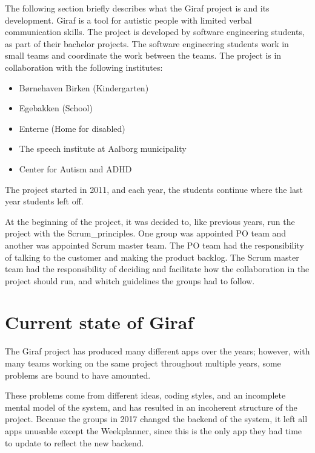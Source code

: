 The following section briefly describes what the Giraf project is and its development. 
Giraf is a tool for autistic people with limited verbal communication skills. The project is developed by software engineering students, as part of their bachelor projects. The software engineering students work in small teams and coordinate the work between the teams. The project is in collaboration with the following institutes\cite{GirafWebsite}:

\begin{itemize}
    \item Børnehaven Birken (Kindergarten) \cite{bhBirken}
    \item Egebakken (School) \cite{egebakken}
    \item Enterne (Home for disabled) \cite{enterne}
    \item The speech institute at Aalborg municipality
    \item Center for Autism and ADHD \cite{center_for_autism}
\end{itemize}

The project started in 2011, and each year, the students continue where the last year students left off.

At the beginning of the project, it was decided to, like previous years, run the project with the \gls{Scrum_principles}. One group was appointed \gls{PO} team and another was appointed Scrum master team. The \gls{PO} team had the responsibility of talking to the customer and making the product backlog. The Scrum master team had the responsibility of deciding and facilitate how the collaboration in the project should run, and whitch guidelines the groups had to follow.

\section{Current state of Giraf}

The Giraf project has produced many different apps over the years; however, with many teams working on the same project throughout multiple years, some problems are bound to have amounted.

These problems come from different ideas, coding styles, and an incomplete mental model of the system, and has resulted in an incoherent structure of the project. Because the groups in 2017 \cite{SW608F18} changed the backend of the system, it left all apps unusable except the Weekplanner, since this is the only app they had time to update to reflect the new backend.

